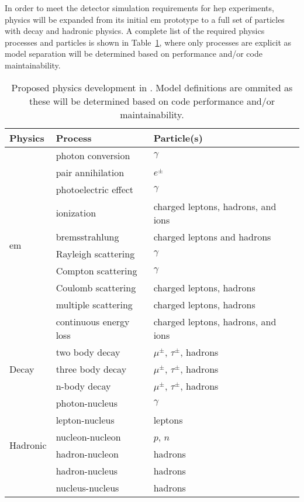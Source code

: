 In order to meet the detector simulation requirements for \acs{hep} experiments,
\celeritas physics will be expanded from its initial \ac{em} prototype to a full
set of particles with decay and hadronic physics.  A complete list of the
required physics processes and particles is shown in
Table~\ref{tab:proposed-physics}, where only processes are explicit as model
separation will be determined based on performance and/or code maintainability.
\begin{table}[h]
  \caption{Proposed physics development in \celeritas. Model definitions are
  ommited as these will be determined based on code performance and/or
  maintainability.}
  \label{tab:proposed-physics}
  \centering
  \begin{tabular}{llll}
    \toprule
    Physics & Process & Particle(s)\\
    \midrule
    \multirow{10}{*}{\acs{em}} & photon conversion & $\gamma$\\
    & pair annihilation & $e^\pm$\\
    & photoelectric effect& $\gamma$\\
    & ionization & charged leptons, hadrons, and ions\\
    & bremsstrahlung & charged leptons and hadrons\\
    & Rayleigh scattering & $\gamma$\\
    & Compton scattering & $\gamma$\\
    & Coulomb scattering & charged leptons, hadrons\\
    & multiple scattering & charged leptons, hadrons\\
    & continuous energy loss & charged leptons, hadrons, and ions\\
    \midrule
    \multirow{3}{*}{Decay}
    & two body decay & $\mu^\pm$, $\tau^\pm$, hadrons\\
    & three body decay & $\mu^\pm$, $\tau^\pm$, hadrons\\
    & n-body decay & $\mu^\pm$, $\tau^\pm$, hadrons\\
    \midrule
    \multirow{6}{*}{Hadronic}
    & photon-nucleus & $\gamma$ \\
    & lepton-nucleus & leptons \\
    & nucleon-nucleon & $p$, $n$\\
    & hadron-nucleon & hadrons\\
    & hadron-nucleus & hadrons\\
    & nucleus-nucleus & hadrons\\
    \bottomrule
  \end{tabular}
\end{table}

